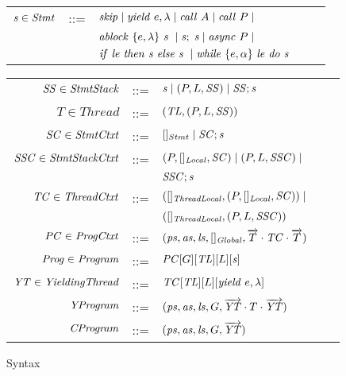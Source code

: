 \begin{figure}
\setlength{\tabcolsep}{3pt}
\begin{tabular}{rclcl}
$\mathit{s} \in \mathit{Stmt}$ &::= & $\mathit{skip} \mid \mathit{yield}\ e,\lambda \mid \mathit{call}\ A \mid \mathit{call}\ P \mid$ \\
                  & & $\mathit{ablock}\ {\{e,\lambda\}}\ {\mathit{s}}\  \mid \mathit{s};\;\mathit{s} \mid \mathit{async}\ P \mid$\\
                  & & ${\mathit{if}\ {\mathit{le}}\ }{\mathit{then}\ {\mathit{s}}\ }{\mathit{else}\ {\mathit{s}}\ } \mid \mathit{while}\ \{{e,\alpha}\}\ {{\mathit{le}}\ } \mathit{do}\ {{\mathit{s}}\ }$ \vspace{6pt} \\
\end{tabular}
\begin{tabular}{rclcl}
$\mathit{SS} \in \mathit{StmtStack}$ &::= & $\mathit{s} \mid (P, L,\mathit{SS}) \mid \mathit{SS};\mathit{s}$ \\
$T \in \mathit{Thread}$ &::= &$(\mathit{TL}, (P, L, \mathit{SS}))$ \\
$\mathit{SC} \in \mathit{StmtCtxt}$ &::= &$[]_{Stmt} \mid \mathit{SC};\mathit{s}$ \\
$\mathit{SSC} \in \mathit{StmtStackCtxt}$ &::= & $(P, []_{\mathit{Local}}, \mathit{SC}) \mid (P, L,\mathit{SSC}) \mid$ \\ 
 & &$\mathit{SSC};\mathit{s}$ \\
$\mathit{TC} \in \mathit{ThreadCtxt}$ &::= &$([]_{\mathit{ThreadLocal}}, (P, []_{\mathit{Local}}, \mathit{SC})) \mid$ \\
 & &$([]_{\mathit{ThreadLocal}}, (P, L, \mathit{SSC}))$ \\
$\mathit{PC} \in \mathit{ProgCtxt}$ &::= & $(\mathit{ps}, \mathit{as}, \mathit{ls}, []_{\mathit{Global}}, \overrightarrow{T} \cdot \mathit{TC} \cdot \overrightarrow{T})$ \\
$\mathit{Prog} \in \mathit{Program}$ &::= & $\mathit{PC}[G][\mathit{TL}][L][\mathit{s}]$ \vspace{6pt} \\
$\mathit{YT} \in \mathit{YieldingThread}$ &::= &$\mathit{TC}[\mathit{TL}][L][\mathit{yield}\ e,\lambda]$ \\
$\mathit{YProgram}$ &::= & $(\mathit{ps}, \mathit{as}, \mathit{ls}, G, \overrightarrow{\mathit{YT}} \cdot T \cdot \overrightarrow{\mathit{YT}})$ \\
$\mathit{CProgram}$ &::= & $(\mathit{ps}, \mathit{as}, \mathit{ls}, G, \overrightarrow{\mathit{YT}})$
\end{tabular}
\caption{Syntax}
\label{fig:syntax}
\end{figure}

